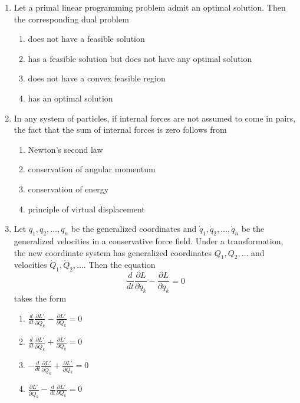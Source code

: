 \documentclass[journal]{IEEEtran}
\numberwithin{equation}{enumi}
\numberwithin{figure}{enumi}
\begin{document}
\begin{enumerate}
\item Let a primal linear programming problem admit an optimal solution. Then the corresponding dual problem
\hfill{}

\begin{enumerate}
\item does not have a feasible solution
\item has a feasible solution but does not have any optimal solution
\item does not have a convex feasible region
\item has an optimal solution
\end{enumerate}


\item In any system of particles, if internal forces are not assumed to come in pairs, the fact that the sum of internal forces is zero follows from
\hfill{}

\begin{enumerate}
\item Newton's second law
\item conservation of angular momentum
\item conservation of energy
\item principle of virtual displacement
\end{enumerate}


\item Let \(q_1, q_2, \ldots, q_n\) be the generalized coordinates and \(\dot{q}_1, \dot{q}_2, \ldots, \dot{q}_n\) be the generalized velocities in a conservative force field. Under a transformation, the new coordinate system has generalized coordinates \(Q_1, Q_2, \ldots\) and velocities \(\dot{Q}_1, \dot{Q}_2, \ldots\). Then the equation
\[
\frac{d}{dt}\frac{\partial L}{\partial \dot{q}_k} - \frac{\partial L}{\partial q_k} = 0
\]
takes the form
\hfill{}
\begin{multicols}{4}
\begin{enumerate}
\item \(\frac{d}{dt}\frac{\partial L'}{\partial \dot{Q}_k} - \frac{\partial L'}{\partial Q_k} = 0\)
\item \(\frac{d}{dt}\frac{\partial L'}{\partial \dot{Q}_k} + \frac{\partial L'}{\partial Q_k} = 0\)
\item \(-\frac{d}{dt}\frac{\partial L'}{\partial \dot{Q}_k} + \frac{\partial L'}{\partial Q_k} = 0\)
\item \(\frac{\partial L'}{\partial \dot{Q}_k} - \frac{d}{dt}\frac{\partial L'}{\partial Q_k} = 0\)
\end{enumerate}
\end{multicols}


\end{enumerate}
\end{document}
